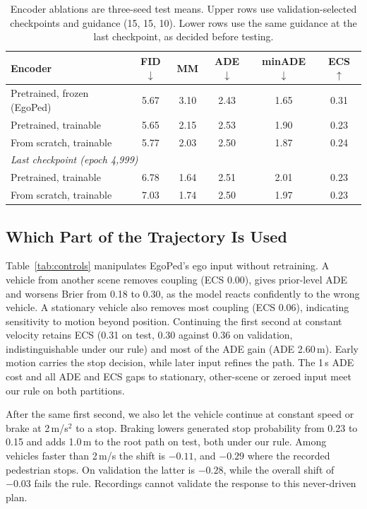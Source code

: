 \documentclass[letterpaper, 10 pt, conference]{ieeeconf}
\newcommand{\method}{EgoPed\xspace}
\begin{document}
\begin{table}[t]
  \centering
  \caption{Encoder ablations are three-seed test means. Upper rows use validation-selected checkpoints and guidance (15, 15, 10). Lower rows use the same guidance at the last checkpoint, as decided before testing.}
  \label{tab:design}
  \vspace{4pt}
  \footnotesize
  \setlength{\tabcolsep}{3pt}
  \begin{tabular}{lccccc}
    \toprule
    Encoder & FID $\downarrow$ & MM & ADE $\downarrow$ & minADE $\downarrow$ & ECS $\uparrow$ \\
    \midrule
    Pretrained, frozen (\method) & 5.67 & 3.10 & 2.43 & 1.65 & 0.31 \\
    Pretrained, trainable & 5.65 & 2.15 & 2.53 & 1.90 & 0.23 \\
    From scratch, trainable & 5.77 & 2.03 & 2.50 & 1.87 & 0.24 \\
    \midrule
    \multicolumn{6}{l}{\textit{Last checkpoint (epoch 4{,}999)}} \\
    Pretrained, trainable & 6.78 & 1.64 & 2.51 & 2.01 & 0.23 \\
    From scratch, trainable & 7.03 & 1.74 & 2.50 & 1.97 & 0.23 \\
    \bottomrule
  \end{tabular}
\end{table}

\subsection{Which Part of the Trajectory Is Used}
\label{sec:controls}

Table~\ref{tab:controls} manipulates \method's ego input without retraining. A vehicle from another scene removes coupling (ECS 0.00), gives prior-level ADE and worsens Brier from 0.18 to 0.30, as the model reacts confidently to the wrong vehicle. A stationary vehicle also removes most coupling (ECS 0.06), indicating sensitivity to motion beyond position. Continuing the first second at constant velocity retains ECS (0.31 on test, 0.30 against 0.36 on validation, indistinguishable under our rule) and most of the ADE gain (ADE 2.60\,m). Early motion carries the stop decision, while later input refines the path. The 1\,s ADE cost and all ADE and ECS gaps to stationary, other-scene or zeroed input meet our rule on both partitions.

After the same first second, we also let the vehicle continue at constant speed or brake at 2\,m/s$^2$ to a stop. Braking lowers generated stop probability from 0.23 to 0.15 and adds 1.0\,m to the root path on test, both under our rule. Among vehicles faster than 2\,m/s the shift is $-0.11$, and $-0.29$ where the recorded pedestrian stops. On validation the latter is $-0.28$, while the overall shift of $-0.03$ fails the rule. Recordings cannot validate the response to this never-driven plan.
\end{document}
